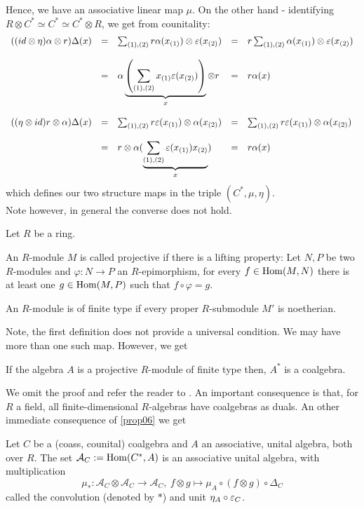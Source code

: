 Hence, we have an associative linear map $\mu$. On the other hand - identifying $R \otimes C^* \simeq C^* \simeq C^* \otimes R$, we get from counitality:
$$\bao{rclcl}
((id \otimes \eta)\alpha\otimes r)\Delta(x) &=& \sum_{(1),(2)} r \alpha(x_{(1)}) \otimes \eps(x_{(2)}) &=& r \sum_{(1),(2)} \alpha(x_{(1)}) \otimes \eps(x_{(2)})\\
&&&&\\
&=& \alpha\underbrace{\left(\sum_{(1),(2)} x_{(1)} \eps(x_{(2)})\right)}_{x} \otimes r &=& r \alpha(x)\\
&&&&\\
((\eta \otimes id) r\otimes \alpha)\Delta(x) &=& \sum_{(1),(2)} r \eps(x_{(1)}) \otimes \alpha(x_{(2)}) &=& \sum_{(1),(2)} r \eps(x_{(1)}) \otimes \alpha(x_{(2)})\\
&&&&\\
&=& r \otimes \alpha(\underbrace{\sum_{(1),(2)} \eps(x_{(1)}) x_{(2)}}_{x}) &=& r \alpha(x)\\
\ea$$
which defines our two structure maps in the triple $(C^*, \mu, \eta)$.\\
\indent Note however, in general the converse does not hold.
\begin{defi}\label{defi09} Let $R$ be a ring.
 \bn
 \item An $R$-module $M$ is called projective if there is a lifting property:
 Let $N, P$ be two $R$-modules and $\varphi : N \rightarrow P$ an $R$-epimorphism, for every $f \in \trm{Hom}(M,N)$ there is at least one $g \in \trm{Hom}(M,P)$ such that $f \circ \varphi = g$.
 \item An $R$-module is of finite type if every proper $R$-submodule $M'$ is noetherian.
 \en
{}
\end{defi}
Note, the first definition does not provide a universal condition. We may have more than one such map. However, we get
\begin{prop}\label{prop07}
If the algebra $A$ is a projective $R$-module of finite type then, $A^*$ is a coalgebra.
\end{prop}
We omit the proof and refer the reader to \cite{OmSho}. An important consequence is that, for $R$ a field, all finite-dimensional $R$-algebras have coalgebras as duals. An other immediate consequence of \ref{prop06} we get
\begin{koro}\label{koro03}
Let $C$ be a (coass, counital) coalgebra and $A$ an associative, unital algebra, both over $R$. The set $\mathcal{A}_C := \trm{Hom}(C^*,A)$ is an associative unital algebra, with multiplication
$$\mu_* : \mathcal{A}_C \otimes \mathcal{A}_C \longrightarrow \mathcal{A}_C,\ f \otimes g \longmapsto \mu_A \circ(f\otimes g) \circ \Delta_C$$
called the convolution (denoted by $*$) and unit $\eta_A \circ \eps_C$.
\end{koro}

